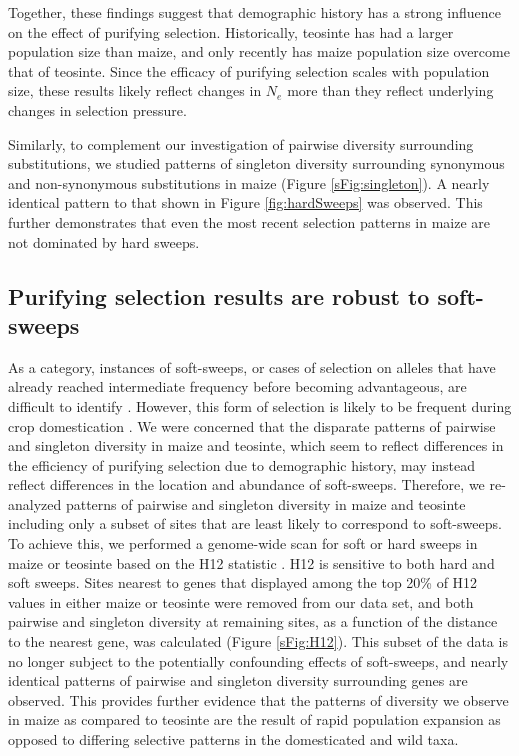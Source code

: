 \documentclass{pnastwo}
\begin{document}
\begin{article}
Together, these findings suggest that demographic history has
a strong influence on the effect of purifying selection. Historically,
teosinte has had a larger population size than maize, and only
recently has maize population size overcome that of teosinte. Since
the efficacy of purifying selection scales with population size,
these results likely reflect changes in $N_e$ more than they reflect
underlying changes in selection pressure.

Similarly, to complement our investigation of pairwise diversity surrounding substitutions, we studied patterns of singleton diversity surrounding synonymous and non-synonymous substitutions in maize (Figure \ref{sFig:singleton}). A nearly identical pattern to that shown in Figure \ref{fig:hardSweeps} was observed. This further demonstrates that even the most recent selection patterns in maize are not dominated by hard sweeps.



\subsection{Purifying selection results are robust to soft-sweeps}
As a category, instances of soft-sweeps, or cases of selection on alleles that have already reached intermediate frequency before becoming advantageous, are difficult to identify \cite{wilson2014}. However, this form of selection is likely to be frequent during crop domestication \cite{innan2004}. We were concerned that the disparate patterns of pairwise and singleton diversity in maize and teosinte, which seem to reflect differences in the efficiency of purifying selection due to demographic history, may instead reflect differences in the location and abundance of soft-sweeps. Therefore, we re-analyzed patterns of pairwise and singleton diversity in maize and teosinte including only a subset of sites that are least likely to correspond to soft-sweeps. To achieve this, we performed a genome-wide scan for soft or hard sweeps in maize or teosinte based on the H12 statistic \cite{garud2015}. H12 is sensitive to both hard and soft sweeps. Sites nearest to genes that displayed among the top 20\% of H12 values in either maize or teosinte were removed from our data set, and both pairwise and singleton diversity at remaining sites, as a function of the distance to the nearest gene, was calculated (Figure \ref{sFig:H12}). This subset of the data is no longer subject to the potentially confounding effects of soft-sweeps, and nearly identical patterns of pairwise and singleton diversity surrounding genes are observed. This provides further evidence that the patterns of diversity we observe in maize as compared to teosinte are the result of rapid population expansion as opposed to differing selective patterns in the domesticated and wild taxa.


\end{article}
\end{document}
